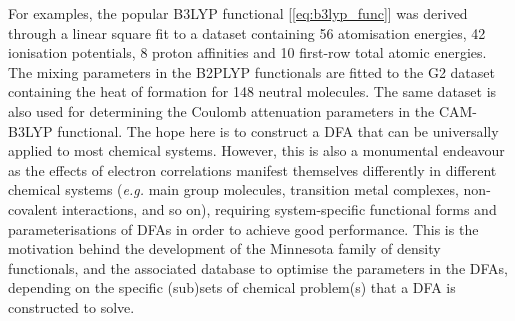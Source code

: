 For examples, the popular B3LYP functional [\cref{eq:b3lyp_func}] was derived through a linear square fit to a dataset containing 56 atomisation energies, 42 ionisation potentials, 8 proton affinities and 10 first-row total atomic energies.\cite{beeke1993density} The mixing parameters in the B2PLYP functionals are fitted to the G2 dataset containing the heat of formation for 148 neutral molecules.\cite{curtiss1997assessment} The same dataset is also used for determining the Coulomb attenuation parameters in the CAM-B3LYP\cite{yanai2004new} functional. The hope here is to construct a DFA that can be universally applied to most chemical systems. However, this is also a monumental endeavour as the effects of electron correlations manifest themselves differently in different chemical systems (\emph{e.g.} main group molecules, transition metal complexes, non-covalent interactions, and so on), requiring system-specific functional forms and parameterisations of DFAs in order to achieve good performance. This is the motivation behind the development of the Minnesota family of density functionals,\cite{peverati2014quest,mardirossian2016accurate} and the associated database\cite{yu2016mn15} to optimise the parameters in the DFAs, depending on the specific (sub)sets of chemical problem(s) that a DFA is constructed to solve. 
